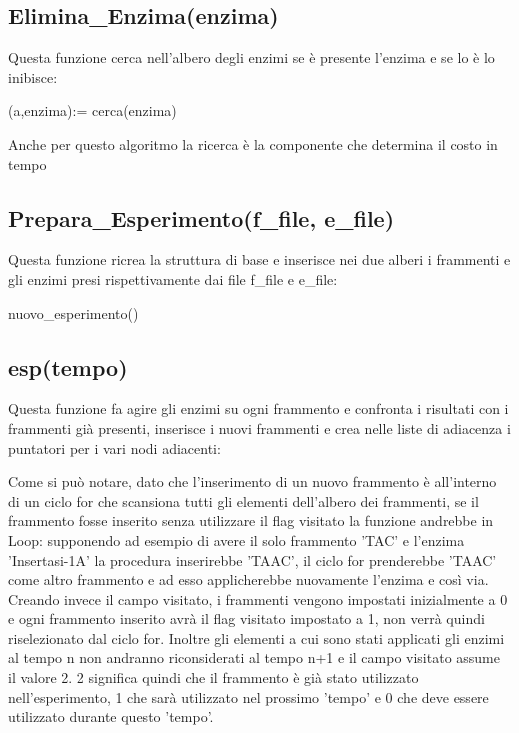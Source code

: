 \documentclass[a4paper,10pt]{article}
\begin{document}
\subsection{Elimina\_{}Enzima(enzima)}
Questa funzione cerca nell'albero degli enzimi se è presente l'enzima e se lo è lo inibisce:

\begin{algorithm}[H]
(a,enzima):= cerca(enzima)\;
\end{algorithm}
Anche per questo algoritmo la ricerca è la componente che determina il costo in tempo
\subsection{Prepara\_{}Esperimento(f\_{}file, e\_{}file)}
Questa funzione ricrea la struttura di base e inserisce nei due alberi i frammenti e gli enzimi presi rispettivamente dai file f\_{}file e e\_{}file:

\begin{algorithm}[H]
nuovo\_{}esperimento()\;


\end{algorithm}
\subsection{esp(tempo)}\label{sec:esp}
Questa funzione fa agire gli enzimi su ogni frammento e confronta i risultati con i frammenti già presenti, inserisce i nuovi frammenti e crea nelle liste di adiacenza i puntatori per i vari nodi adiacenti:

\begin{algorithm}[H]
\end{algorithm}
Come si può notare, dato che l'inserimento di un nuovo frammento è all'interno di un ciclo for che scansiona tutti gli elementi dell'albero dei frammenti, se il frammento fosse inserito senza utilizzare il flag visitato la funzione andrebbe in Loop: supponendo ad esempio di avere il solo frammento 'TAC' e l'enzima 'Insertasi-1A' la procedura inserirebbe 'TAAC', il ciclo for prenderebbe 'TAAC' come altro frammento e ad esso applicherebbe nuovamente l'enzima e così via. Creando invece il campo visitato, i frammenti vengono impostati inizialmente a 0 e ogni frammento inserito avrà il flag visitato impostato a 1, non verrà quindi riselezionato dal ciclo for. Inoltre gli elementi a cui sono stati applicati gli enzimi al tempo n non andranno riconsiderati al tempo n+1 e il campo visitato assume il valore 2. 2 significa quindi che il frammento è già stato utilizzato nell'esperimento, 1 che sarà utilizzato nel prossimo 'tempo' e 0 che deve essere utilizzato durante questo 'tempo'.
\end{document}
